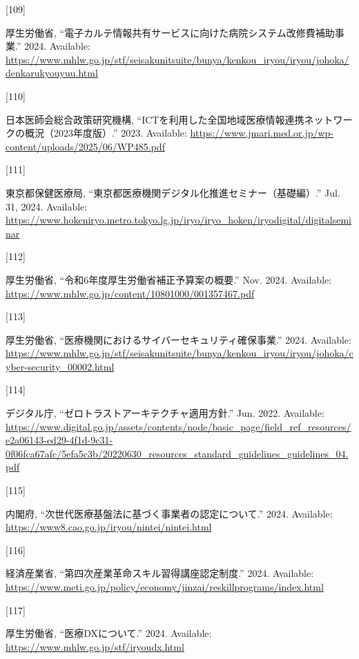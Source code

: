 \documentclass[
  a4paper,
  a4paper,
  11pt]{ltjsbook}
\newlength{\cslhangindent}
\newlength{\csllabelwidth}
\newenvironment{CSLReferences}[2] %
 {\begin{list}{}{%
  \setlength{\itemindent}{0pt}
  \setlength{\leftmargin}{0pt}
  \setlength{\parsep}{0pt}
  \ifodd #1
   \setlength{\leftmargin}{\cslhangindent}
   \setlength{\itemindent}{-1\cslhangindent}
  \fi
  \setlength{\itemsep}{#2\baselineskip}}}
 {\end{list}}
\newcommand{\CSLLeftMargin}[1]{\parbox[t]{\csllabelwidth}{\strut#1\strut}}
\newcommand{\CSLRightInline}[1]{\parbox[t]{\linewidth - \csllabelwidth}{\strut#1\strut}}
\begin{document}
\begin{CSLReferences}{0}{0}
\CSLLeftMargin{{[}109{]} }%
\CSLRightInline{厚生労働省,
{``電子カルテ情報共有サービスに向けた病院システム改修費補助事業.''}
2024. Available:
\url{https://www.mhlw.go.jp/stf/seisakunitsuite/bunya/kenkou_iryou/iryou/johoka/denkarukyouyuu.html}}

\CSLLeftMargin{{[}110{]} }%
\CSLRightInline{日本医師会総合政策研究機構,
{``ICTを利用した全国地域医療情報連携ネットワークの概況（2023年度版）.''}
2023. Available:
\url{https://www.jmari.med.or.jp/wp-content/uploads/2025/06/WP485.pdf}}

\CSLLeftMargin{{[}111{]} }%
\CSLRightInline{東京都保健医療局,
{``東京都医療機関デジタル化推進セミナー（基礎編）.''} Jul. 31, 2024.
Available:
\url{https://www.hokeniryo.metro.tokyo.lg.jp/iryo/iryo_hoken/iryodigital/digitalseminar}}

\CSLLeftMargin{{[}112{]} }%
\CSLRightInline{厚生労働省, {``令和6年度厚生労働省補正予算案の概要.''}
Nov. 2024. Available:
\url{https://www.mhlw.go.jp/content/10801000/001357467.pdf}}

\CSLLeftMargin{{[}113{]} }%
\CSLRightInline{厚生労働省,
{``医療機関におけるサイバーセキュリティ確保事業.''} 2024. Available:
\url{https://www.mhlw.go.jp/stf/seisakunitsuite/bunya/kenkou_iryou/iryou/johoka/cyber-security_00002.html}}

\CSLLeftMargin{{[}114{]} }%
\CSLRightInline{デジタル庁, {``ゼロトラストアーキテクチャ適用方針.''}
Jun. 2022. Available:
\url{https://www.digital.go.jp/assets/contents/node/basic_page/field_ref_resources/e2a06143-ed29-4f1d-9c31-0f06fca67afc/5efa5c3b/20220630_resources_standard_guidelines_guidelines_04.pdf}}

\CSLLeftMargin{{[}115{]} }%
\CSLRightInline{内閣府,
{``次世代医療基盤法に基づく事業者の認定について.''} 2024. Available:
\url{https://www8.cao.go.jp/iryou/nintei/nintei.html}}

\CSLLeftMargin{{[}116{]} }%
\CSLRightInline{経済産業省, {``第四次産業革命スキル習得講座認定制度.''}
2024. Available:
\url{https://www.meti.go.jp/policy/economy/jinzai/reskillprograms/index.html}}

\CSLLeftMargin{{[}117{]} }%
\CSLRightInline{厚生労働省, {``医療DXについて.''} 2024. Available:
\url{https://www.mhlw.go.jp/stf/iryoudx.html}}


\end{CSLReferences}
\end{document}
